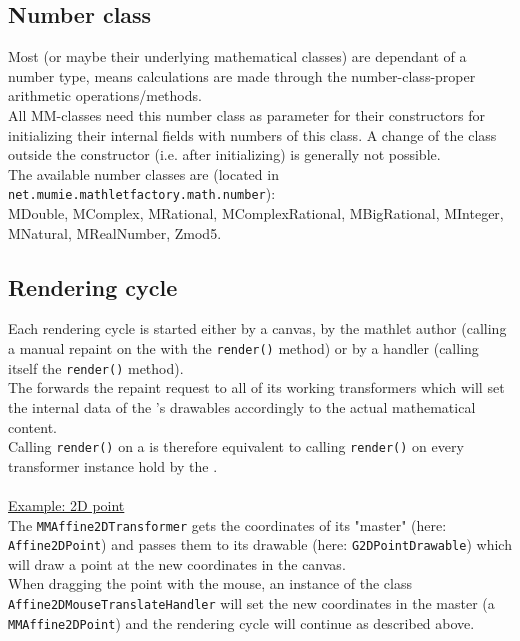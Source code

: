 \subsection{Number class}
  Most \mmos (or maybe their underlying mathematical classes) are dependant of a number type,
  means calculations are made through the number-class-proper arithmetic operations/methods.\\
  All MM-classes need this number class as parameter for their constructors for initializing their
  internal fields with numbers of this class. A change of the class outside the constructor (i.e. after
  initializing) is generally not possible.\\
  The available number classes are (located in \verb|net.mumie.mathletfactory.math.number|):\\
  {\ttfamily
    MDouble, MComplex, MRational, MComplexRational, MBigRational, MInteger, MNatural, MRealNumber, Zmod5.\\
  }

  
\subsection{Rendering cycle}
  Each rendering cycle is started either by a canvas, by the mathlet author (calling a manual repaint on the \mmo with 
  the \verb|render()| method) or by a handler (calling itself the \verb|render()| method).\\
  The \mmo forwards the repaint request to all of its working transformers which will set the internal data
  of the \mmo's drawables accordingly to the actual mathematical content.\\
  Calling \verb|render()| on a \mmo is therefore equivalent to calling \verb|render()| on every transformer
  instance hold by the \mmo.\\
  \\
  \underline{Example: 2D point}\\
  The \verb|MMAffine2DTransformer| gets the coordinates of its "master" (here: \verb|Affine2DPoint|) and passes 
  them to its drawable (here: \verb|G2DPointDrawable|) which will draw a point at the new coordinates in the canvas.\\
  When dragging the point with the mouse, an instance of the class \verb|Affine2D|\-\verb|MouseTranslateHandler| will set 
  the new coordinates in the master (a \verb|MMAffine2DPoint|) and the rendering cycle will continue
  as described above.
  
  
\newpage
